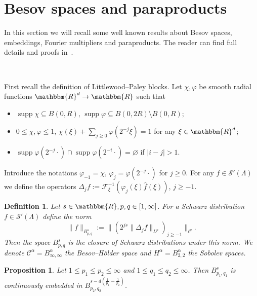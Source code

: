 \documentclass[11pt]{article}
\newcommand{\assign}{:=}
\newcommand{\tmop}[1]{\ensuremath{\operatorname{#1}}}
\newtheorem{definition}{Definition}
\newtheorem{proposition}{Proposition}
{\theorembodyfont{\rmfamily}\newtheorem{remark}{Remark}}
\newcommand{\VV}{\mathscr{C}}
\newcommand{\CF}{\mathscr{F}}
\newcommand{\CS}{\mathscr{S}}
\begin{document}
\appendix\section{Besov spaces and paraproducts}\label{sec:appendix-para}

In this section we will recall some well known results about Besov spaces,
embeddings, Fourier multipliers and paraproducts. The reader can find full
details and proofs
in~{\cite{bahouri_fourier_2011,gubinelli_paracontrolled_2015}}.

\

First recall the definition of Littlewood--Paley blocks. Let $\chi, \varphi$
be smooth radial functions $\mathbbm{R}^d \rightarrow \mathbbm{R}$ such that
\begin{itemize}
  \item $\tmop{supp} \chi \subseteq B (0, R)$, $\tmop{supp} \varphi \subseteq
  B (0, 2 R) \setminus B (0, R)$;
  
  \item $0 \leqslant \chi, \varphi \leqslant 1$, $\chi (\xi) + \sum_{j \geq 0}
  \varphi (2^{- j} \xi) = 1$ for any $\xi \in \mathbbm{R}^d$;
  
  \item $\tmop{supp} \varphi (2^{- j} \cdot) \cap \tmop{supp} \varphi (2^{- i}
  \cdot) = \varnothing$ if $| i - j | > 1$.
\end{itemize}
Introduce the notations $\varphi_{- 1} = \chi$, $\varphi_j = \varphi (2^{- j}
\cdot)$ for $j \geqslant 0$. For any $f \in \CS' (\Lambda)$ we define the
operators $\Delta_j f \assign \mathcal{\CF}^{- 1}_{\xi} (\varphi_j (\xi)
\hat{f} (\xi))$, $j \geqslant - 1$.

\begin{definition}
  Let $s \in \mathbbm{R}, p, q \in [1, \infty]$. For a Schwarz distribution $f
  \in \CS' (\Lambda)$ define the norm
  \[ \| f \|_{B_{p, q}^s} \assign \| (2^{j s} \| \Delta_j f \|_{L^p})_{j
     \geqslant - 1} \|_{\ell^q} . \]
  Then the space $B^s_{p, q}$ is the closure of Schwarz distributions under
  this norm. We denote $\VV^{\alpha} = B_{\infty, \infty}^{\alpha}$ the
  Besov--H{\"o}lder space and $H^{\alpha} = B^{\alpha}_{2, 2}$ the Sobolev
  spaces. \ 
\end{definition}

\begin{proposition}
  \label{besovembedding}Let $1 \leqslant p_1 \leqslant p_2 \leqslant \infty$
  and $1 \leqslant q_1 \leqslant q_2 \leqslant \infty$. Then $B^s_{p_1, q_1}$
  is continuously embedded in $B_{p_2, q_2}^{s - d \left( \frac{1}{p_1} -
  \frac{1}{p_2} \right)}$.
\end{proposition}
\end{document}

